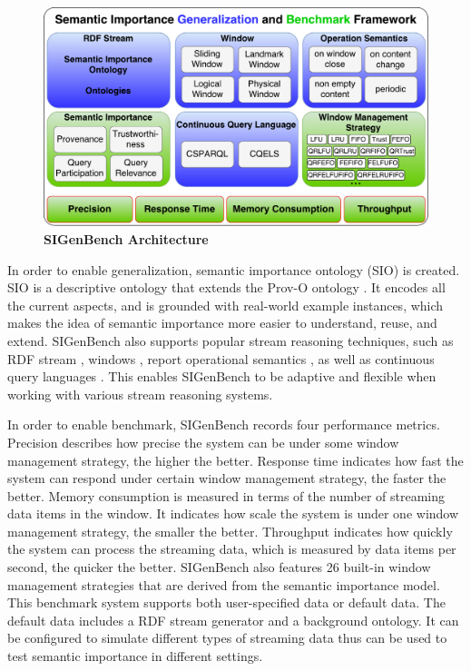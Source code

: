 \begin{figure}[!htbp]
	\centering
    \includegraphics[width=5in]{img/6-sib.pdf}
    \caption{\textbf{SIGenBench Architecture}}
    \label{fig:6-sib}
\end{figure}

In order to enable generalization, semantic importance ontology (SIO) is created.
SIO is a descriptive ontology that extends the Prov-O ontology \cite{lebo2013prov}. 
It encodes all the current aspects, and is grounded with real-world example instances, which makes the idea of semantic importance more easier to understand, reuse, and extend. 
SIGenBench also supports popular stream reasoning techniques, such as RDF stream \cite{della2009s}, windows \cite{patroumpas2006window}, report operational semantics \cite{botan2010secret}, as well as continuous query languages \cite{le2011native} \cite{barbieri2009c}.
This enables SIGenBench to be adaptive and flexible when working with various stream reasoning systems. 

In order to enable benchmark, SIGenBench records four performance metrics.
Precision describes how precise the system can be under some window management strategy, the higher the better.
Response time indicates how fast the system can respond under certain window management strategy, the faster the better. 
Memory consumption is measured in terms of the number of streaming data items in the window.
It indicates how scale the system is under one window management strategy, the smaller the better.
Throughput indicates how quickly the system can process the streaming data, which is measured by data items per second, the quicker the better. 
SIGenBench also features 26 built-in window management strategies that are derived from the semantic importance model. 
This benchmark system supports both user-specified data or default data. 
The default data includes a RDF stream generator and a background ontology.
It can be configured to simulate different types of streaming data thus can be used to test semantic importance in different settings. 
%
